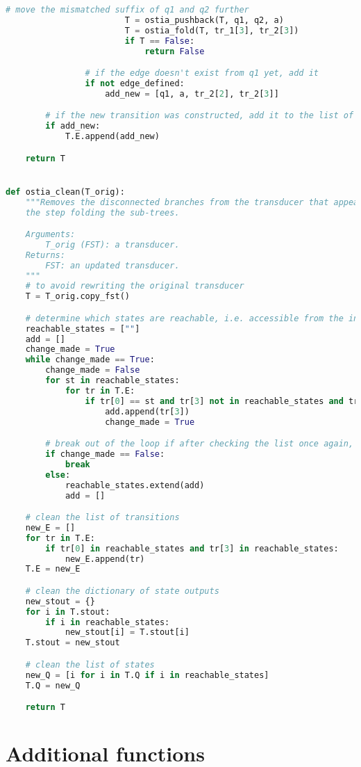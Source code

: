 \begin{lstlisting}[language=Python]
                        # move the mismatched suffix of q1 and q2 further
                        T = ostia_pushback(T, q1, q2, a)
                        T = ostia_fold(T, tr_1[3], tr_2[3])
                        if T == False:
                            return False

                # if the edge doesn't exist from q1 yet, add it
                if not edge_defined:
                    add_new = [q1, a, tr_2[2], tr_2[3]]

        # if the new transition was constructed, add it to the list of transitions
        if add_new:
            T.E.append(add_new)

    return T


def ostia_clean(T_orig):
    """Removes the disconnected branches from the transducer that appear due to
    the step folding the sub-trees.

    Arguments:
        T_orig (FST): a transducer.
    Returns:
        FST: an updated transducer.
    """
    # to avoid rewriting the original transducer
    T = T_orig.copy_fst()

    # determine which states are reachable, i.e. accessible from the initial state
    reachable_states = [""]
    add = []
    change_made = True
    while change_made == True:
        change_made = False
        for st in reachable_states:
            for tr in T.E:
                if tr[0] == st and tr[3] not in reachable_states and tr[3] not in add:
                    add.append(tr[3])
                    change_made = True

        # break out of the loop if after checking the list once again, no states were added
        if change_made == False:
            break
        else:
            reachable_states.extend(add)
            add = []

    # clean the list of transitions
    new_E = []
    for tr in T.E:
        if tr[0] in reachable_states and tr[3] in reachable_states:
            new_E.append(tr)
    T.E = new_E

    # clean the dictionary of state outputs
    new_stout = {}
    for i in T.stout:
        if i in reachable_states:
            new_stout[i] = T.stout[i]
    T.stout = new_stout

    # clean the list of states
    new_Q = [i for i in T.Q if i in reachable_states]
    T.Q = new_Q

    return T
\end{lstlisting}

\section{Additional functions}

